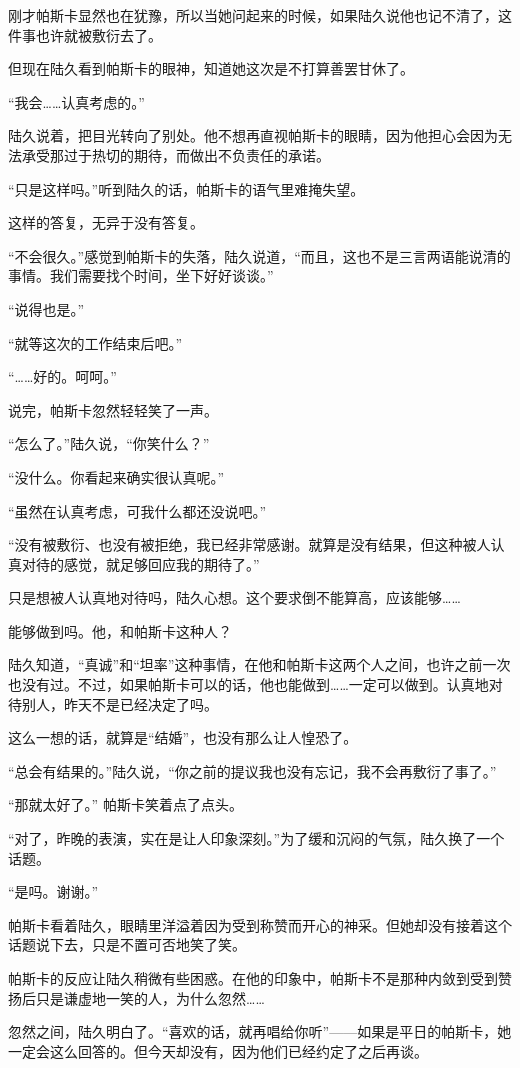 刚才帕斯卡显然也在犹豫，所以当她问起来的时候，如果陆久说他也记不清了，这件事也许就被敷衍去了。

但现在陆久看到帕斯卡的眼神，知道她这次是不打算善罢甘休了。

“我会……认真考虑的。”

陆久说着，把目光转向了别处。他不想再直视帕斯卡的眼睛，因为他担心会因为无法承受那过于热切的期待，而做出不负责任的承诺。

“只是这样吗。”听到陆久的话，帕斯卡的语气里难掩失望。

这样的答复，无异于没有答复。

“不会很久。”感觉到帕斯卡的失落，陆久说道，“而且，这也不是三言两语能说清的事情。我们需要找个时间，坐下好好谈谈。”

“说得也是。”

“就等这次的工作结束后吧。”

“……好的。呵呵。”

说完，帕斯卡忽然轻轻笑了一声。

“怎么了。”陆久说，“你笑什么？”

“没什么。你看起来确实很认真呢。”

“虽然在认真考虑，可我什么都还没说吧。”

“没有被敷衍、也没有被拒绝，我已经非常感谢。就算是没有结果，但这种被人认真对待的感觉，就足够回应我的期待了。”

只是想被人认真地对待吗，陆久心想。这个要求倒不能算高，应该能够……

能够做到吗。他，和帕斯卡这种人？

陆久知道，“真诚”和“坦率”这种事情，在他和帕斯卡这两个人之间，也许之前一次也没有过。不过，如果帕斯卡可以的话，他也能做到……一定可以做到。认真地对待别人，昨天不是已经决定了吗。

这么一想的话，就算是“结婚”，也没有那么让人惶恐了。

“总会有结果的。”陆久说，“你之前的提议我也没有忘记，我不会再敷衍了事了。”

“那就太好了。” 帕斯卡笑着点了点头。

“对了，昨晚的表演，实在是让人印象深刻。”为了缓和沉闷的气氛，陆久换了一个话题。

“是吗。谢谢。”

帕斯卡看着陆久，眼睛里洋溢着因为受到称赞而开心的神采。但她却没有接着这个话题说下去，只是不置可否地笑了笑。

帕斯卡的反应让陆久稍微有些困惑。在他的印象中，帕斯卡不是那种内敛到受到赞扬后只是谦虚地一笑的人，为什么忽然……

忽然之间，陆久明白了。“喜欢的话，就再唱给你听”——如果是平日的帕斯卡，她一定会这么回答的。但今天却没有，因为他们已经约定了之后再谈。

